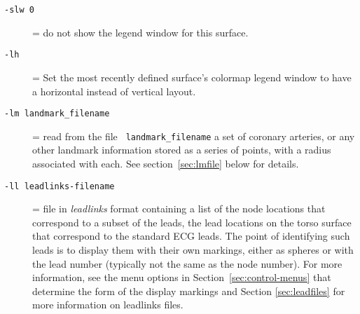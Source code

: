\begin{description}
  \item[{\tt -slw 0}] = do not show the legend window for this surface.

  \item[{\tt -lh }] = Set the most recently defined surface's colormap
        legend window to have a horizontal instead of vertical layout.

  \item[{\tt -lm landmark\_filename }] = read from the file {\tt
      landmark\_filename} a set of coronary arteries, or any other
    landmark information stored as a series of points, with a radius
    associated with each.  See section~\ref{sec:lmfile} below for
    details.
    
  \item[{\tt -ll leadlinks-filename}] = file in {\em
      leadlinks\/} format containing a list of the node locations
    that correspond to a subset of the leads, \eg{} the lead
    locations on the torso surface that correspond to the standard
    ECG leads.  The point of identifying such leads is to display
    them with their own markings, either as spheres or with the
    lead number (typically not the same as the node number).  For
    more information, 
    see the menu options in
    Section~\ref{sec:control-menus} that determine the form of the display
    markings and Section \ref{sec:leadfiles} for more information on 
    leadlinks files.
    





\end{description}


